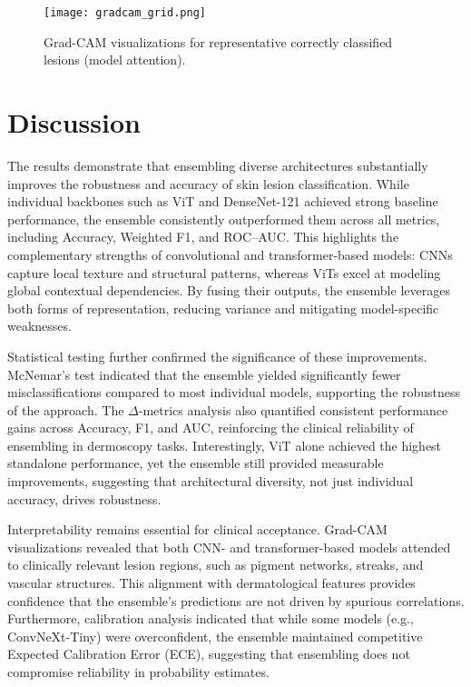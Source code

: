 \documentclass[preprint,12pt]{elsarticle}
\begin{document}
\begin{figure}[htbp]
\centering
\texttt{[image: gradcam\_grid.png]}
\caption{Grad-CAM visualizations for representative correctly classified lesions (model attention).}
\label{fig:gradcam}
\end{figure}

\section{Discussion}

The results demonstrate that ensembling diverse architectures substantially improves the robustness and accuracy of skin lesion classification. 
While individual backbones such as ViT and DenseNet-121 achieved strong baseline performance, the ensemble consistently outperformed them across all metrics, including Accuracy, Weighted F1, and ROC--AUC. 
This highlights the complementary strengths of convolutional and transformer-based models: CNNs capture local texture and structural patterns, whereas ViTs excel at modeling global contextual dependencies. 
By fusing their outputs, the ensemble leverages both forms of representation, reducing variance and mitigating model-specific weaknesses.

Statistical testing further confirmed the significance of these improvements. 
McNemar’s test indicated that the ensemble yielded significantly fewer misclassifications compared to most individual models, supporting the robustness of the approach. 
The $\Delta$-metrics analysis also quantified consistent performance gains across Accuracy, F1, and AUC, reinforcing the clinical reliability of ensembling in dermoscopy tasks. 
Interestingly, ViT alone achieved the highest standalone performance, yet the ensemble still provided measurable improvements, suggesting that architectural diversity, not just individual accuracy, drives robustness.

Interpretability remains essential for clinical acceptance. 
Grad-CAM visualizations revealed that both CNN- and transformer-based models attended to clinically relevant lesion regions, such as pigment networks, streaks, and vascular structures. 
This alignment with dermatological features provides confidence that the ensemble’s predictions are not driven by spurious correlations. 
Furthermore, calibration analysis indicated that while some models (e.g., ConvNeXt-Tiny) were overconfident, the ensemble maintained competitive Expected Calibration Error (ECE), suggesting that ensembling does not compromise reliability in probability estimates.
\end{document}
